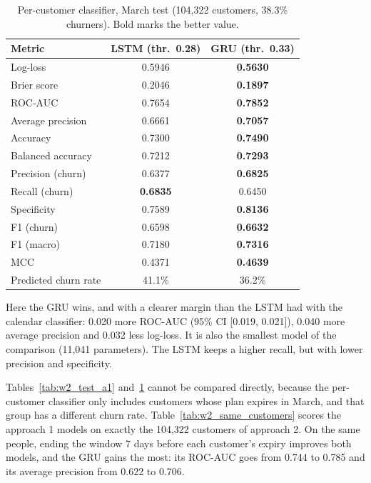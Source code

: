 \documentclass{article}
\begin{document}
\begin{table}[H]
\centering
\renewcommand{\arraystretch}{1.25}
\begin{tabular}{|l|c|c|}
\hline
\textbf{Metric} & \textbf{LSTM (thr.\ 0.28)} & \textbf{GRU (thr.\ 0.33)} \\ \hline
Log-loss            & 0.5946 & \textbf{0.5630} \\ \hline
Brier score         & 0.2046 & \textbf{0.1897} \\ \hline
ROC-AUC             & 0.7654 & \textbf{0.7852} \\ \hline
Average precision   & 0.6661 & \textbf{0.7057} \\ \hline
Accuracy            & 0.7300 & \textbf{0.7490} \\ \hline
Balanced accuracy   & 0.7212 & \textbf{0.7293} \\ \hline
Precision (churn)   & 0.6377 & \textbf{0.6825} \\ \hline
Recall (churn)      & \textbf{0.6835} & 0.6450 \\ \hline
Specificity         & 0.7589 & \textbf{0.8136} \\ \hline
F1 (churn)          & 0.6598 & \textbf{0.6632} \\ \hline
F1 (macro)          & 0.7180 & \textbf{0.7316} \\ \hline
MCC                 & 0.4371 & \textbf{0.4639} \\ \hline
Predicted churn rate & 41.1\% & 36.2\% \\ \hline
\end{tabular}
\caption{Per-customer classifier, March test (104{,}322 customers, 38.3\% churners). Bold marks the better value.}
\label{tab:w2_test_a2}
\end{table}

Here the GRU wins, and with a clearer margin than the LSTM had with the calendar classifier: 0.020 more ROC-AUC (95\% CI [0.019, 0.021]), 0.040 more average precision and 0.032 less log-loss. It is also the smallest model of the comparison (11{,}041 parameters). The LSTM keeps a higher recall, but with lower precision and specificity.

Tables~\ref{tab:w2_test_a1} and~\ref{tab:w2_test_a2} cannot be compared directly, because the per-customer classifier only includes customers whose plan expires in March, and that group has a different churn rate. Table~\ref{tab:w2_same_customers} scores the approach 1 models on exactly the 104{,}322 customers of approach 2. On the same people, ending the window 7 days before each customer's expiry improves both models, and the GRU gains the most: its ROC-AUC goes from 0.744 to 0.785 and its average precision from 0.622 to 0.706.
\end{document}
